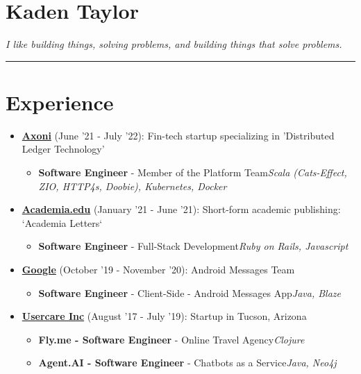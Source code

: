 \documentclass{article}
\begin{document}
\setlength{\parindent}{0pt}
\setlength{\parskip}{0pt}
\section*{Kaden Taylor}
\textit{I like building things, solving problems, and building things that solve problems.}
\newline

\noindent\rule{\linewidth}{1pt}

\section*{Experience}

\begin{itemize}
\item \href{https://axoni.com}{\textbf{Axoni}} {(June '21 - July '22)}: Fin-tech startup specializing in 'Distributed Ledger Technology' 
\begin{itemize}
\item \textbf{Software Engineer} - Member of the Platform Team\newline \textit{Scala (Cats-Effect, ZIO, HTTP4s, Doobie), Kubernetes, Docker}
\end{itemize}

\item \href{https://academia.edu}{\textbf{Academia.edu}} {(January '21 - June '21)}: Short-form academic publishing: `Academia Letters` 
\begin{itemize}
\item \textbf{Software Engineer} - Full-Stack Development\newline \textit{Ruby on Rails, Javascript}
\end{itemize}

\item \href{https://google.com}{\textbf{Google}} {(October '19 - November '20)}: Android Messages Team 
\begin{itemize}
\item \textbf{Software Engineer} - Client-Side - Android Messages App\newline \textit{Java, Blaze}
\end{itemize}

\item \href{https://www.crunchbase.com/organization/usercare}{\textbf{Usercare Inc}} {(August '17 - July '19)}: Startup in Tucson, Arizona 
\begin{itemize}
\item \textbf{Fly.me - Software Engineer} - Online Travel Agency\newline \textit{Clojure}
\item \textbf{Agent.AI - Software Engineer} - Chatbots as a Service\newline \textit{Java, Neo4j}
\end{itemize}


\end{itemize}
\end{document}
